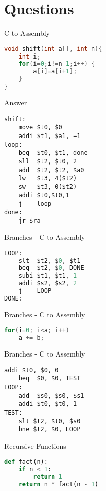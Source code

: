 \section{Questions}
\begin{frame}[fragile]{C to Assembly}
\begin{lstlisting}[language=c, keywordstyle=\color{purple}\textbf]
void shift(int a[], int n){
    int i;
    for(i=0;i!=n-1;i++) {
        a[i]=a[i+1];
    }
}
\end{lstlisting}

\end{frame}

\begin{frame}[fragile]{Answer}
\begin{lstlisting}[keywordstyle=\color{purple}\textbf, keywords={move, addi, beq, sll, add, lw, sw, j, jr}]
shift:
    move $t0, $0
    addi $t1, $a1, −1
loop:
    beq  $t0, $t1, done
    sll  $t2, $t0, 2
    add  $t2, $t2, $a0
    lw   $t3, 4($t2)
    sw   $t3, 0($t2)
    addi $t0,$t0,1
    j    loop
done:
    jr $ra
\end{lstlisting}
\end{frame}

\begin{frame}[fragile]{Branches - C to Assembly}
\begin{lstlisting}[language=c, keywordstyle=\color{purple}\textbf]
LOOP:
    slt  $t2, $0, $t1
    beq  $t2, $0, DONE
    subi $t1, $t1, 1
    addi $s2, $s2, 2
    j    LOOP
DONE:
\end{lstlisting}    
\end{frame}

\begin{frame}[fragile]{Branches - C to Assembly}
\begin{lstlisting}[language=c, keywordstyle=\color{purple}\textbf]
for(i=0; i<a; i++)
    a += b;
\end{lstlisting}    
\end{frame}

\begin{frame}[fragile]{Branches - C to Assembly}
\begin{lstlisting}[keywords={addi, beq, add, slt, bne}, keywordstyle=\color{purple}\textbf]
    addi $t0, $0, 0
    beq  $0, $0, TEST
LOOP: 
    add  $s0, $s0, $s1
    addi $t0, $t0, 1
TEST: 
    slt $t2, $t0, $s0
    bne $t2, $0, LOOP
\end{lstlisting}    
\end{frame}


\begin{frame}[fragile]{Recursive Functions}
\begin{lstlisting}[keywordstyle=\color{purple}\textbf, language=python]
def fact(n):
    if n < 1:
        return 1
    return n * fact(n - 1)
\end{lstlisting}    
\end{frame}

